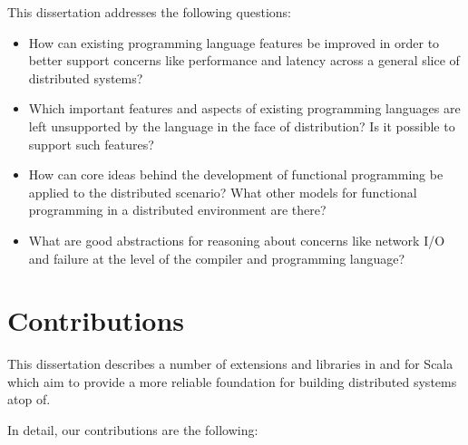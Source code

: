 
%

This dissertation addresses the following questions:

\begin{itemize}

	\item How can existing programming language features be improved in order to
	better support concerns like performance and latency across a general slice of
	distributed systems?

	\item Which important features and aspects of existing programming languages
	are left unsupported by the language in the face of distribution? Is it
	possible to support such features?

	\item How can core ideas behind the development of functional programming be
	applied to the distributed scenario? What other models for functional
	programming in a distributed environment are there?

	\item What are good abstractions for reasoning about concerns like network I/O
	and failure at the level of the compiler and programming language?

\end{itemize}

\section{Contributions}

This dissertation describes a number of extensions and libraries in and for
Scala which aim to provide a more reliable foundation for building distributed
systems atop of.

In detail, our contributions are the following:


